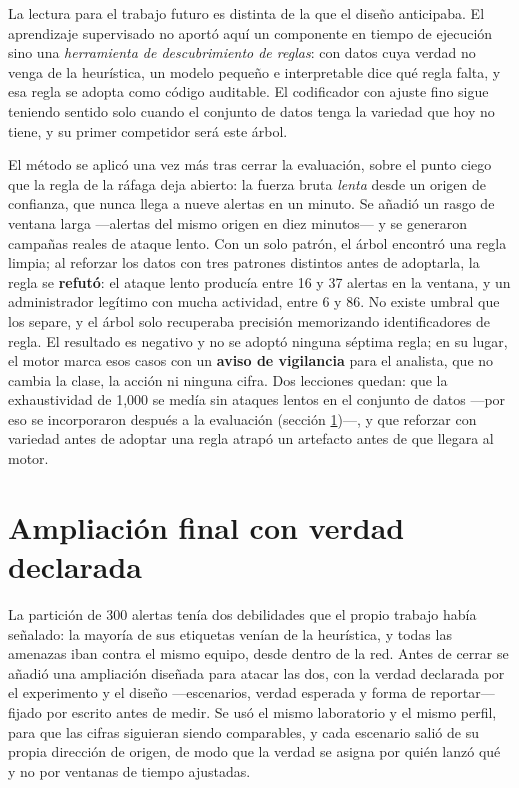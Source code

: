 La lectura para el trabajo futuro es distinta de la que el diseño anticipaba. El aprendizaje
supervisado no aportó aquí un componente en tiempo de ejecución sino una \emph{herramienta de
descubrimiento de reglas}: con datos cuya verdad no venga de la heurística, un modelo pequeño e
interpretable dice qué regla falta, y esa regla se adopta como código auditable. El codificador
con ajuste fino sigue teniendo sentido solo cuando el conjunto de datos tenga la variedad que
hoy no tiene, y su primer competidor será este árbol.

El método se aplicó una vez más tras cerrar la evaluación, sobre el punto ciego que la regla de la
ráfaga deja abierto: la fuerza bruta \emph{lenta} desde un origen de confianza, que nunca llega a
nueve alertas en un minuto. Se añadió un rasgo de ventana larga ---alertas del mismo origen en diez
minutos--- y se generaron campañas reales de ataque lento. Con un solo patrón, el árbol encontró una
regla limpia; al reforzar los datos con tres patrones distintos antes de adoptarla, la regla se
\textbf{refutó}: el ataque lento producía entre 16 y 37 alertas en la ventana, y un administrador
legítimo con mucha actividad, entre 6 y 86. No existe umbral que los separe, y el árbol solo
recuperaba precisión memorizando identificadores de regla. El resultado es negativo y no se adoptó
ninguna séptima regla; en su lugar, el motor marca esos casos con un \textbf{aviso de vigilancia}
para el analista, que no cambia la clase, la acción ni ninguna cifra. Dos lecciones quedan: que la
exhaustividad de 1,000 se medía sin ataques lentos en el conjunto de datos ---por eso se
incorporaron después a la evaluación (sección \ref{sec:ampliacion})---, y que reforzar con
variedad antes de adoptar una regla atrapó un artefacto antes de que llegara al motor.

\section{Ampliación final con verdad declarada}
\label{sec:ampliacion}

La partición de 300 alertas tenía dos debilidades que el propio trabajo había señalado: la mayoría
de sus etiquetas venían de la heurística, y todas las amenazas iban contra el mismo equipo, desde
dentro de la red. Antes de cerrar se añadió una ampliación diseñada para atacar las dos, con la
verdad declarada por el experimento y el diseño ---escenarios, verdad esperada y forma de reportar---
fijado por escrito antes de medir. Se usó el mismo laboratorio y el mismo perfil, para que las
cifras siguieran siendo comparables, y cada escenario salió de su propia dirección de origen, de
modo que la verdad se asigna por quién lanzó qué y no por ventanas de tiempo ajustadas.

